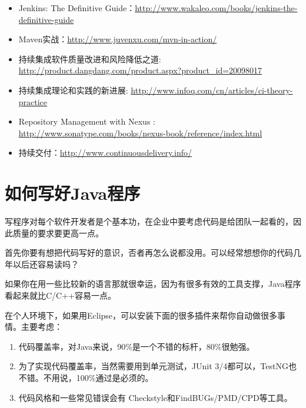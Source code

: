 \begin{itemize}
\item Jenkins: The Definitive Guide：\href{http://www.wakaleo.com/books/jenkins-the-definitive-guide}{http:/\slash www.wakaleo.com\slash books\slash jenkins-the-definitive-guide}

\item Maven实战：\href{http://www.juvenxu.com/mvn-in-action/}{http:/\slash www.juvenxu.com\slash mvn-in-action\slash }

\item 持续集成软件质量改进和风险降低之道: \href{http://product.dangdang.com/product.aspx?product_id=20098017}{http:/\slash product.dangdang.com\slash product.aspx?product\_id=20098017}

\item 持续集成理论和实践的新进展: \href{http://www.infoq.com/cn/articles/ci-theory-practice}{http:/\slash www.infoq.com\slash cn\slash articles\slash ci-theory-practice}

\item Repository Management with Nexus : \href{http://www.sonatype.com/books/nexus-book/reference/index.html}{http:/\slash www.sonatype.com\slash books\slash nexus-book\slash reference\slash index.html}

\item 持续交付：\href{http://www.continuousdelivery.info/}{http:/\slash www.continuousdelivery.info\slash }

\end{itemize}

\chapter{如何写好Java程序}
\label{如何写好java程序}

写程序对每个软件开发者是个基本功，在企业中要考虑代码是给团队一起看的，因此质量的要求要更高一点。

首先你要有想把代码写好的意识，否者再怎么说都没用。可以经常想想你的代码几年以后还容易读吗？

如果你在用一些比较新的语言那就很幸运，因为有很多有效的工具支撑，Java程序看起来就比C\slash C++容易一点。

在个人环境下，如果用Eclipse，可以安装下面的很多插件来帮你自动做很多事情。主要考虑：

\begin{enumerate}
\item 代码覆盖率，对Java来说，90\%是一个不错的标杆，80\%很勉强。

\item 为了实现代码覆盖率，当然需要用到单元测试，JUnit 3\slash 4都可以，TestNG也不错。不用说，100\%通过是必须的。

\item 代码风格和一些常见错误会有 Checkstyle和FindBUGs\slash PMD\slash CPD等工具。

\end{enumerate}


